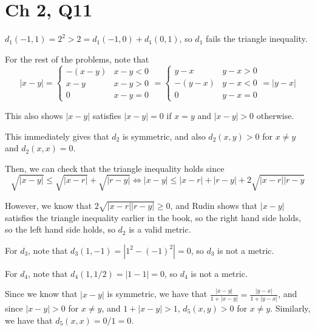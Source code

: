 \documentclass[12pt,letterpaper]{article}
\theoremstyle{definition}
\begin{document}
\section*{Ch 2, Q11}

$d_{1}(-1,1) = 2^{2} > 2 = d_{1}(-1,0) + d_{1}(0,1)$, so $d_{1}$ fails the triangle inequality.

For the rest of the problems, note that
\[
  |x - y| =
  \begin{cases}
    -(x - y) & x - y < 0 \\
    x - y & x - y > 0 \\
    0 & x - y = 0
  \end{cases} =
  \begin{cases}
    y - x & y - x > 0 \\
    -(y - x) & y - x < 0\\
    0 & y - x = 0
  \end{cases} =
  |y - x|
\]

This also shows $|x - y|$ satisfies $|x - y| = 0$ if $x = y$ and $|x - y| > 0$ otherwise.

This immediately gives that $d_{2}$ is symmetric, and also $d_{2}(x,y) > 0$ for $x \neq y$ and $d_{2}(x,x) = 0$.

Then, we can check that the triangle inequality holds since
\[
  \sqrt{|x - y|} \leq \sqrt{|x - r|} + \sqrt{|r - y|} \iff |x-y| \leq |x-r| + |r-y| + 2\sqrt{|x-r||r-y}
\]

However, we know that $2\sqrt{|x-r||r-y|} \geq 0$, and Rudin shows that $|x-y|$ satisfies the triangle inequality earlier in the book, so the right hand side holds, so the left hand side holds, so $d_{2}$ is a valid metric.

For $d_{3}$, note that $d_{3}(1,-1) = |1^{2} - (-1)^{2}| = 0$, so $d_{3}$ is not a metric.

For $d_{4}$, note that $d_{4}(1, 1 / 2) = |1 - 1| = 0$, so $d_{4}$ is not a metric.

Since we know that $|x-y|$ is symmetric, we have that $\frac{|x-y|}{1 + |x-y|} = \frac{|y-x|}{1 + |y-x|}$, and since $|x-y| > 0$ for $x\neq y$, and $1 + |x - y| > 1$, $d_{5}(x,y) > 0$ for $x \neq y$. Similarly, we have that $d_{5}(x,x) = 0 / 1 = 0$.
\end{document}
